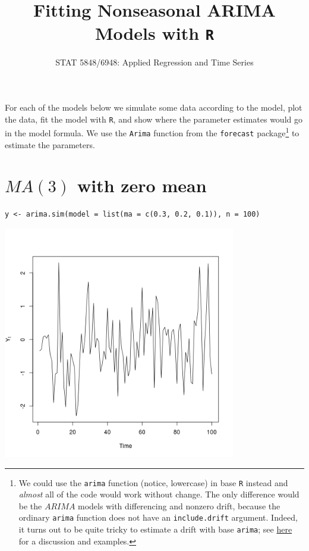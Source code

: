 \documentclass[12pt]{article}
\title{Fitting Nonseasonal ARIMA Models with \texttt{R}}
\date{\vspace{-0.5in}STAT 5848/6948: Applied Regression and Time Series}
\begin{document}
\maketitle


For each of the models below we simulate some data according to the model, plot the data, fit the model with \texttt{R}, and show where the parameter estimates would go in the model formula.  We use the \texttt{Arima} function from the \texttt{forecast} package\footnote{We could use the \texttt{arima} function (notice, lowercase) in base \texttt{R} instead and \emph{almost} all of the code would work without change.  The only difference would be the $ARIMA$ models with differencing and nonzero drift, because the ordinary \texttt{arima} function does not have an \texttt{include.drift} argument.  Indeed, it turns out to be quite tricky to estimate a drift with base \texttt{arima}; see \href{http://www.stat.pitt.edu/stoffer/tsa3/Rissues.htm}{here} for a discussion and examples. } to estimate the parameters.




\section*{$MA(3)$ with zero mean}
\label{sec-1}


\begin{verbatim}
y <- arima.sim(model = list(ma = c(0.3, 0.2, 0.1)), n = 100)
\end{verbatim}





\includegraphics[width=4.0in]{img/ma3zm.png}
\end{document}
